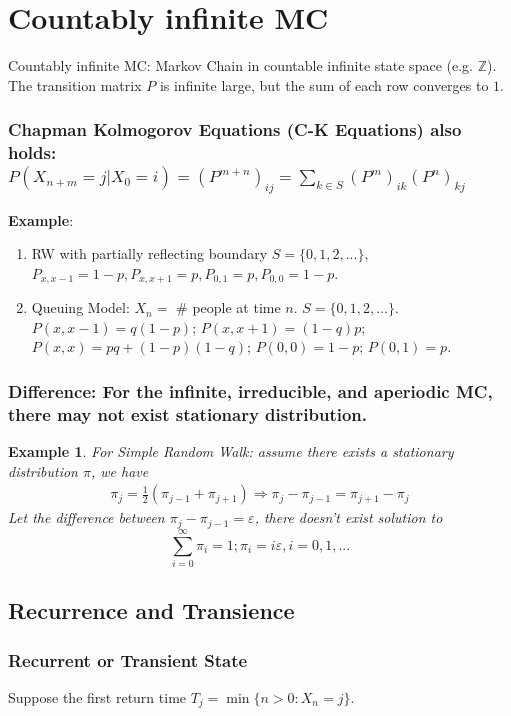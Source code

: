 \documentclass[11pt,a4paper]{article}
\newtheorem{example}{Example}
\begin{document}
\section{ Countably infinite MC}
Countably infinite MC: Markov Chain in countable infinite state space (e.g. $\mathbb{Z}$). The transition matrix $P$ is infinite large, but the sum of each row converges to $1$.
\subsubsection*{ Chapman Kolmogorov Equations (C-K Equations) also holds: $P(X_{n+m}=j|X_0=i)=(P^{m+n})_{ij}=\sum_{k\in S}(P^{m})_{ik}(P^{n})_{kj}$}
\textbf{Example}:
\begin{enumerate}[(1)]
    \item RW with partially reflecting boundary $S=\{0,1,2,...\}$, $P_{x,x-1}=1-p,P_{x,x+1}=p, P_{0,1}=p, P_{0,0}=1-p$.
    \item Queuing Model: $X_n=$ \# people at time $n$. $S=\{0,1,2,...\}$. $P(x,x-1)=q(1-p)$; $P(x,x+1)=(1-q)p$; $P(x,x)=pq+(1-p)(1-q)$; $P(0,0)=1-p$; $P(0,1)=p$.
\end{enumerate}

\subsubsection*{Difference: For the infinite, irreducible, and aperiodic MC, there may not exist stationary distribution.}
\begin{example}
    For Simple Random Walk: assume there exists a stationary distribution $\pi$, we have
    \begin{equation}
        \begin{aligned}
            \pi_j=\frac{1}{2}(\pi_{j-1}+\pi_{j+1}) \Rightarrow \pi_j-\pi_{j-1}=\pi_{j+1}-\pi_j
        \end{aligned}
        \nonumber
    \end{equation}
    Let the difference between $\pi_j-\pi_{j-1}=\varepsilon$, there doesn't exist solution to
    $$\sum_{i=0}^\infty \pi_i=1; \pi_i=i \varepsilon, i=0,1,...$$
\end{example}

\subsection{Recurrence and Transience}

\subsubsection{Recurrent or Transient State}
Suppose the first return time $T_j=\min\{n>0:X_n=j\}$.
\end{document}
